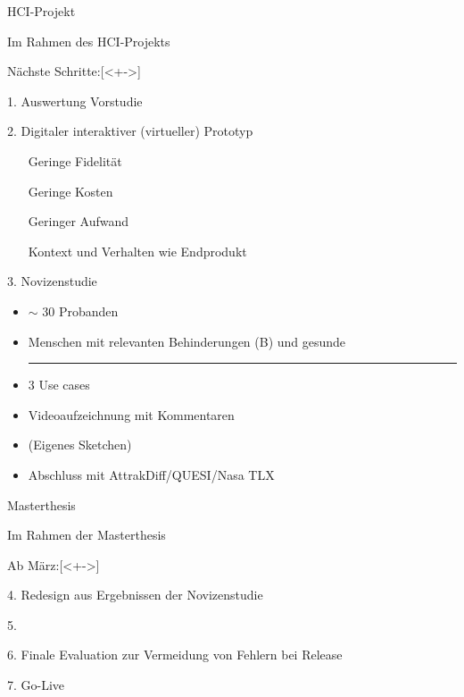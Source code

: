 



\begin{subsection}{HCI-Projekt}
\begin{frame}{Im Rahmen des HCI-Projekts}


	\begin{titleditems}{Nächste Schritte:}[<+->]
	\pause
	\item[1.]Auswertung Vorstudie
	\item[2.]Digitaler interaktiver (virtueller) Prototyp \cite{Arnowitz:2006:EPS:1196696}
		\pause
		\begin{itemize}
		\item[\strong{-}]Geringe Fidelität
		\item[\strong{+}]Geringe Kosten
		\item[\strong{+}]Geringer Aufwand
		\item[\strong{+}]Kontext und Verhalten wie Endprodukt
		\end{itemize}

	\pause

	\item[3.]Novizenstudie
		\pause
		\begin{itemize}
		\item $\sim$ 30 Probanden
		\item Menschen mit relevanten Behinderungen (B) und gesunde
		\noindent\rule{8cm}{0.4pt}
		\item 3 Use cases
		\item Videoaufzeichnung mit Kommentaren
		\item (Eigenes Sketchen)
		\item Abschluss mit AttrakDiff/QUESI/Nasa TLX
		\end{itemize}
	\end{titleditems}

\end{frame}
\end{subsection} %




\begin{subsection}{Masterthesis}
\begin{frame}{Im Rahmen der Masterthesis}



	\begin{titleditems}{Ab März:}[<+->]
		\item[4.]Redesign aus Ergebnissen der Novizenstudie
		\item[5.]
		\item[6.]Finale Evaluation zur Vermeidung von Fehlern bei Release
		\item[7.]Go-Live 
	\end{titleditems}
	
\end{frame}
\end{subsection} %

\begin{frame}
\end{frame}






